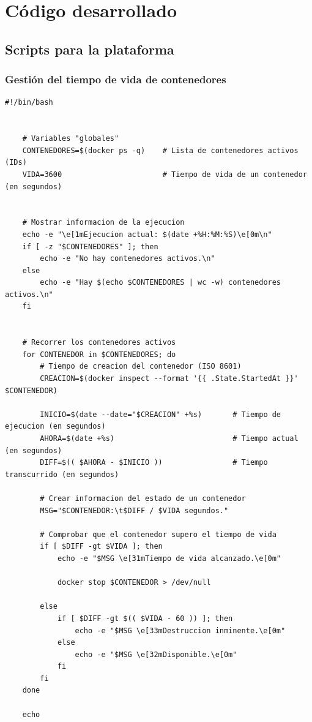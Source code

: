 \chapter{Código desarrollado}

    \section{Scripts para la plataforma}
        \label{sec:scripts}

        \subsection{Gestión del tiempo de vida de contenedores}
            
            \begin{lstlisting}[style=bash_style, basicstyle=\ttfamily\scriptsize]
    #!/bin/bash


    # Variables "globales"
    CONTENEDORES=$(docker ps -q)    # Lista de contenedores activos (IDs)
    VIDA=3600                       # Tiempo de vida de un contenedor (en segundos)


    # Mostrar informacion de la ejecucion
    echo -e "\e[1mEjecucion actual: $(date +%H:%M:%S)\e[0m\n"
    if [ -z "$CONTENEDORES" ]; then
        echo -e "No hay contenedores activos.\n"
    else
        echo -e "Hay $(echo $CONTENEDORES | wc -w) contenedores activos.\n"
    fi


    # Recorrer los contenedores activos
    for CONTENEDOR in $CONTENEDORES; do
        # Tiempo de creacion del contenedor (ISO 8601)
        CREACION=$(docker inspect --format '{{ .State.StartedAt }}' $CONTENEDOR)

        INICIO=$(date --date="$CREACION" +%s)       # Tiempo de ejecucion (en segundos)
        AHORA=$(date +%s)                           # Tiempo actual (en segundos)
        DIFF=$(( $AHORA - $INICIO ))                # Tiempo transcurrido (en segundos)

        # Crear informacion del estado de un contenedor
        MSG="$CONTENEDOR:\t$DIFF / $VIDA segundos."

        # Comprobar que el contenedor supero el tiempo de vida
        if [ $DIFF -gt $VIDA ]; then
            echo -e "$MSG \e[31mTiempo de vida alcanzado.\e[0m"
            
            docker stop $CONTENEDOR > /dev/null

        else
            if [ $DIFF -gt $(( $VIDA - 60 )) ]; then
                echo -e "$MSG \e[33mDestruccion inminente.\e[0m"
            else
                echo -e "$MSG \e[32mDisponible.\e[0m"
            fi
        fi
    done

    echo
            \end{lstlisting}
    
